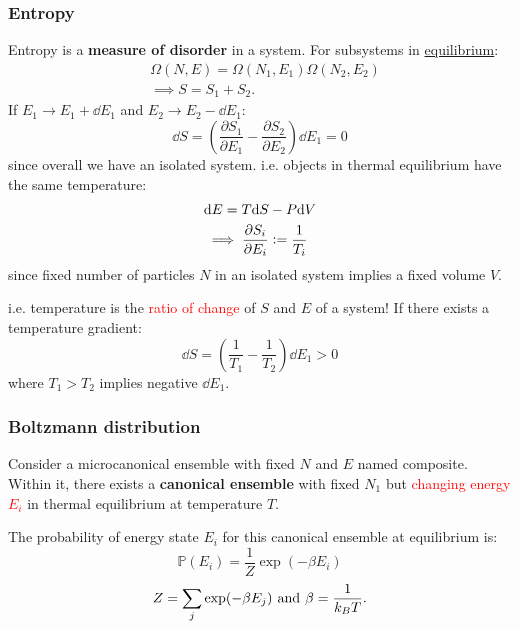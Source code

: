 \documentclass{article}
\newcommand{\deq}{\vcentcolon=}
\begin{document}
\begin{multicols*}{3}
\subsubsection*{Entropy}
Entropy is a \textbf{measure of disorder} in a system.
For subsystems in \underline{equilibrium}:
\begin{align*}
    &\Omega(N,E)=\Omega(N_1,E_1)\Omega(N_2,E_2) \\
    &\implies S=S_1+S_2.
\end{align*}
If $E_1\rightarrow E_1+\dd E_1$ and
$E_2\rightarrow E_2-\dd E_1$:
$$\dd S=\left(\frac{\partial S_1}{\partial E_1}
-\frac{\partial S_2}{\partial E_2}\right)\dd E_1=0$$
since overall we have an isolated system.
i.e. objects in thermal equilibrium have the same temperature:
\begin{align*}
    &\dd E=T\dd S-P\dd V \\
    &\implies\frac{\partial S_i}{\partial E_i}
    \deq\frac{1}{T_i}
\end{align*}
since fixed number of particles $N$ 
in an isolated system implies a fixed volume $V$.

i.e. temperature is the \textcolor{red}{ratio of change}
of $S$ and $E$ of a system!
If there exists a temperature gradient:
$$\dd S=\left(\frac{1}{T_1}-\frac{1}{T_2}\right)
\dd E_1>0$$ where $T_1>T_2$ implies negative $\dd E_1$.

\subsubsection*{Boltzmann distribution}
Consider a microcanonical ensemble with fixed $N$ and $E$
named composite.
Within it, there exists a \textbf{canonical ensemble}
with fixed $N_1$ but \textcolor{red}{changing energy $E_i$}
in thermal equilibrium at temperature $T$.

The probability of energy state $E_i$ for
this canonical ensemble at equilibrium is:
$$\mathbb{P}(E_i)=\frac{1}{Z}\exp(-\beta E_i)$$
$$Z=\sum_j\exp(-\beta E_j)
\hspace{0.05in}\text{and}\hspace{0.05in}
\beta=\frac{1}{k_B T}.$$


\end{multicols*}
\end{document}
